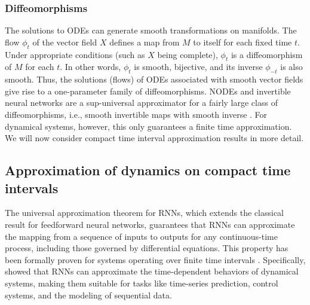 \documentclass{article}
\newcounter{ct}
\begin{document}
\subsubsection{Diffeomorphisms}%
The solutions to ODEs can generate smooth transformations on manifolds.
The flow \( \phi_t \) of the vector field \( X \) defines a map from \( M \) to itself for each fixed time \( t \). Under appropriate conditions (such as \( X \) being complete), \( \phi_t \) is a diffeomorphism of \( M \) for each \( t \). In other words, \( \phi_t \) is smooth, bijective, and its inverse \( \phi_{-t} \) is also smooth.
Thus, the solutions (flows) of ODEs associated with smooth vector fields give rise to a one-parameter family of diffeomorphisms.
%
NODEs and invertible neural networks are a sup-universal approximator for a fairly large class of diffeomorphisms, i.e., smooth invertible maps with smooth inverse  \citep{huang2018neural, jaini2019sum, teshima2020uap, teshima2020coupling, ishikawa2023uap, massaroli2020dissecting}.
For dynamical systems, however, this only guarantees a finite time approximation.
We will now consider compact time interval approximation results in more detail.



\subsection{Approximation of dynamics on compact time intervals}\label{sec:compacttime}
The universal approximation theorem for RNNs, which extends the classical result for feedforward neural networks, guarantees that RNNs can approximate the mapping from a sequence of inputs to outputs for any continuous-time process, including those governed by differential equations.
%
This property has been formally proven for systems operating over finite time intervals  \citep{li1992approximation}. %
Specifically, \citet{funahashi1993approximation} showed that RNNs can approximate the time-dependent behaviors of dynamical systems, making them suitable for tasks like time-series prediction, control systems, and the modeling of sequential data.
\end{document}
